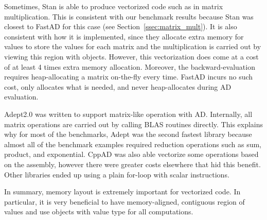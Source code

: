 Sometimes, Stan is able to produce vectorized code such as in matrix multiplication.
This is consistent with our benchmark results because Stan was closest to FastAD
for this case (see Section~\ref{ssec:matrix_mult}).
It is also consistent with how it is implemented,
since they allocate extra memory for  values to store the values for each matrix 
and the multiplication is carried out by viewing this region with  objects.
However, this vectorization does come at a cost of at least 4 times extra memory allocation.
Moreover, the backward-evaluation requires heap-allocating a matrix on-the-fly every time.
FastAD incurs no such cost, only allocates what is needed, and never heap-allocates during AD evaluation.

Adept2.0 was written to support matrix-like operation with AD.\@
Internally, all matrix operations are carried out by calling BLAS routines directly.
This explains why for most of the benchmarks, Adept was the second fastest library
because almost all of the benchmark examples required 
reduction operations such as sum, product, and exponential.
CppAD was also able vectorize some operations based on the assembly,
however there were greater costs elsewhere that hid this benefit.
Other libraries ended up using a plain for-loop with scalar instructions.

In summary, memory layout is extremely important for vectorized code.
In particular, it is very beneficial to have memory-aligned, 
contiguous region of values
and use  objects with  value type for all computations.
